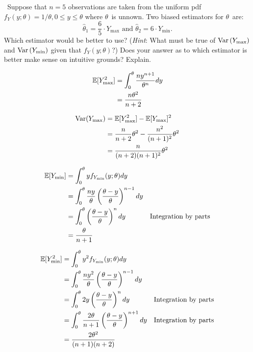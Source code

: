 \begin{problem}
  ~Suppose that ${n = 5}$ observations are taken from the uniform pdf ${f_{Y}(y;\theta) = 1/\theta, 0 \leq y \leq \theta}$ where $\theta$~is unnown.  Two biased estimators for $\theta$~are:
  \begin{equation*}
    \hat{\theta}_1 = \frac{6}{5} \cdot Y_{\max} \text{ and } \hat{\theta}_2 = 6\cdot Y_{\min}\text{.}
  \end{equation*}
  \noindent
  Which estimator would be better to use? (\textit{Hint}: What must be true of $\text{Var}\left(Y_{\max}\right)$ and $\text{Var}\left(Y_{\min}\right)$ given that ${f_{Y}(y;\theta)}$?) Does your answer as to which estimator is better make sense on intuitive grounds? Explain.
\end{problem}

\begin{align*}
  \mathbb{E}\lbrack Y_{\max}^2\rbrack &= \int_{0}^{\theta} \frac{n y^{n+1}}{\theta^{n}} dy \\
                                &= \frac{n\theta^2}{n+2}
\end{align*}

\begin{align*}
  \text{Var}(Y_{\max}) &= \mathbb{E}\lbrack Y_{\max}^2\rbrack - \mathbb{E}\lbrack Y_{\max}\rbrack^{2} \\
                       &= \frac{n}{n+2}\theta^2 - \frac{n^2}{(n+1)^{2}}\theta^2 \\
                       &= \frac{n}{(n+2)(n+1)^{2}}\theta^{2}
\end{align*}

\begin{align*}
  \mathbb{E}\lbrack Y_{\min}\rbrack &= \int_{0}^{\theta} y f_{Y_{\min}}(y;\theta)dy \\
                    &= \int_{0}^{\theta} \frac{ny}{\theta}\left(\frac{\theta -y}{\theta}\right)^{n-1} dy \\
                    &= \int_{0}^{\theta} \left(\frac{\theta -y}{\theta}\right)^{n} dy & \text{Integration by parts} \\
                    &= \frac{\theta}{n+1}
\end{align*}

\begin{align*}
  \mathbb{E}\lbrack Y_{\min}^{2}\rbrack &= \int_{0}^{\theta} y^2 f_{Y_{\min}}(y;\theta)dy \\
                    &= \int_{0}^{\theta} \frac{ny^2}{\theta}\left(\frac{\theta -y}{\theta}\right)^{n-1} dy \\
                    &= \int_{0}^{\theta} 2y\left(\frac{\theta -y}{\theta}\right)^{n} dy & \text{Integration by parts} \\
                    &= \int_{0}^{\theta} \frac{2\theta}{n+1} \left(\frac{\theta -y}{\theta}\right)^{n+1} dy & \text{Integration by parts} \\
                    &= \frac{2\theta^2}{(n+1)(n+2)}
\end{align*}

